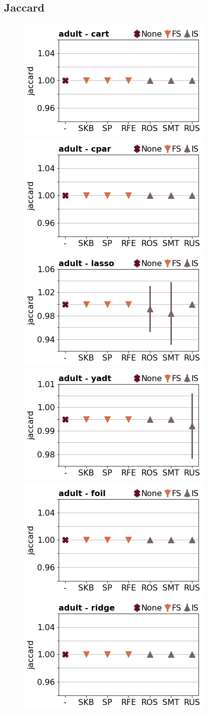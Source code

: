 \documentclass[runningheads,a4paper]{llncs}
\begin{document}
\clearpage
\subsection{Jaccard}

\begin{figure}[!h]
\includegraphics[width=0.32\linewidth]{fig/preps_adult_DT_sklearn_jaccard.png}
\includegraphics[width=0.32\linewidth]{fig/preps_adult_RB_cpar_jaccard.png}
\includegraphics[width=0.32\linewidth]{fig/preps_adult_LM_lasso_jaccard.png}
\includegraphics[width=0.32\linewidth]{fig/preps_adult_DT_yadt_jaccard.png}
\includegraphics[width=0.32\linewidth]{fig/preps_adult_RB_foil_jaccard.png}
\includegraphics[width=0.32\linewidth]{fig/preps_adult_LM_ridge_jaccard.png}
\end{figure}
\end{document}
